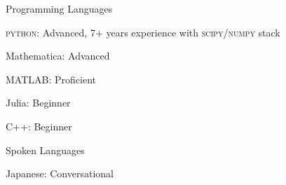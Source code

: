 

\begin{cventries}
  \cventry
    {Programming Languages} %
    {} %
    {} %
    {} %
    {
      \begin{cvitems} %
        \item \textsc{python}: Advanced, 7+ years experience with \textsc{scipy/numpy} stack
        \item Mathematica: Advanced
        \item MATLAB: Proficient
        \item Julia: Beginner
        \item C++: Beginner
      \end{cvitems}
    }

    \cventry
    {Spoken Languages}
    {}
    {}
    {}
    {
      \begin{cvitems}
      \item Japanese: Conversational
    \end{cvitems}
    }

\end{cventries}
